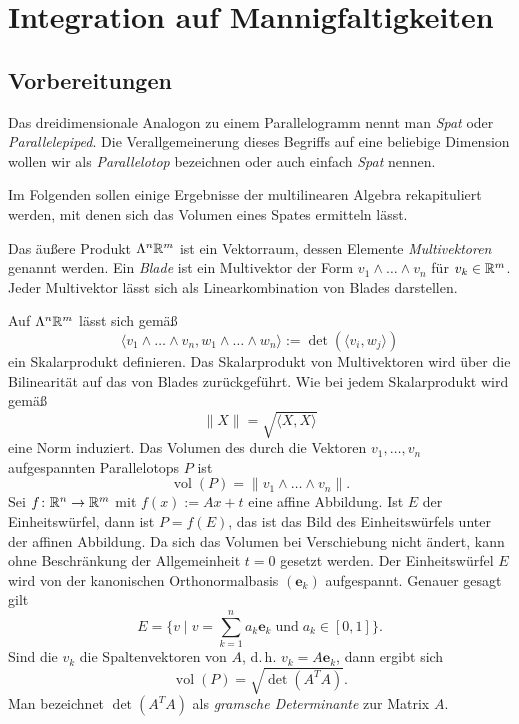 
\chapter{Integration auf Mannigfaltigkeiten}

\section{Vorbereitungen}

Das dreidimensionale Analogon zu einem Parallelogramm nennt man
\emph{Spat} oder \emph{Parallelepiped}. Die
Verallgemeinerung dieses Begriffs auf eine beliebige Dimension wollen
wir als \emph{Parallelotop}
bezeichnen oder auch einfach \emph{Spat} nennen. 

Im Folgenden sollen einige Ergebnisse der multilinearen Algebra
rekapituliert werden, mit denen sich das Volumen eines Spates ermitteln
lässt.

Das äußere Produkt $\Lambda^n \mathbb R^m$ ist ein Vektorraum, dessen Elemente
\emph{Multivektoren} genannt werden. Ein
\emph{Blade} ist ein Multivektor der Form
$v_1\wedge\ldots\wedge v_n$ für $v_k\in\mathbb R^m$. Jeder Multivektor lässt
sich als Linearkombination von Blades darstellen.

Auf $\Lambda^n\mathbb R^m$ lässt sich gemäß
\begin{equation}
\langle v_1\wedge\ldots\wedge v_n,w_1\wedge\ldots\wedge w_n\rangle
:= \det(\langle v_i,w_j\rangle)
\end{equation}
ein Skalarprodukt definieren. Das Skalarprodukt von Multivektoren
wird über die Bilinearität auf das von Blades zurückgeführt. Wie
bei jedem Skalarprodukt wird gemäß
\begin{equation}
\|X\| = \sqrt{\langle X,X\rangle}
\end{equation}
eine Norm induziert. Das Volumen des durch die Vektoren $v_1,\ldots,v_n$
aufgespannten Parallelotops $P$ ist
\begin{equation}\label{eq:vol}
\operatorname{vol}(P) = \|v_1\wedge\ldots\wedge v_n\|.
\end{equation}
Sei $f\colon\mathbb R^n\to\mathbb R^m$ mit $f(x):=Ax+t$ eine affine Abbildung.
Ist $E$ der Einheitswürfel, dann ist $P=f(E)$, das ist das Bild des
Einheitswürfels unter der affinen Abbildung. Da sich das Volumen
bei Verschiebung nicht ändert, kann ohne Beschränkung der Allgemeinheit
$t=0$ gesetzt werden. Der Einheitswürfel $E$ wird von der kanonischen
Orthonormalbasis $(\mathbf e_k)$ aufgespannt. Genauer gesagt gilt
\begin{equation}\textstyle
E = \{v\mid v = \sum_{k=1}^n a_k\mathbf e_k\;\text{und}\;a_k\in [0,1]\}.
\end{equation}
Sind die $v_k$ die Spaltenvektoren von $A$, d.\,h. $v_k = A\mathbf e_k$,
dann ergibt sich
\begin{equation}\label{eq:vol-gram}
\operatorname{vol}(P) = \sqrt{\det(A^T A)}.
\end{equation}
Man bezeichnet $\det(A^T A)$ als
\emph{gramsche Determinante}
zur Matrix $A$.

